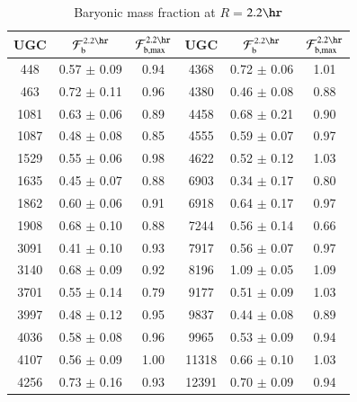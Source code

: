 %
%
%
\begin{table}
\caption{\label{tab:F}
Baryonic mass fraction at $R$$=$$2.2\hr$}
\centering
%
\begin{tabular}{|c c c| c c c|}
\hline
%
\multicolumn{1}{|c}{UGC}                                &
\multicolumn{1}{c}{$\mathcal{F}_{\rm b}^{2.2\hr}$}      &
\multicolumn{1}{c|}{$\mathcal{F}_{\rm b,max}^{2.2\hr}$} &
\multicolumn{1}{c}{UGC}                                 &
\multicolumn{1}{c}{$\mathcal{F}_{\rm b}^{2.2\hr}$}      &
\multicolumn{1}{c|}{$\mathcal{F}_{\rm b,max}^{2.2\hr}$} \\
\hline
  448 &  0.57 $\pm$ 0.09 & 0.94 &  4368 &  0.72 $\pm$ 0.06 & 1.01 \\
  463 &  0.72 $\pm$ 0.11 & 0.96 &  4380 &  0.46 $\pm$ 0.08 & 0.88 \\
 1081 &  0.63 $\pm$ 0.06 & 0.89 &  4458 &  0.68 $\pm$ 0.21 & 0.90 \\
 1087 &  0.48 $\pm$ 0.08 & 0.85 &  4555 &  0.59 $\pm$ 0.07 & 0.97 \\
 1529 &  0.55 $\pm$ 0.06 & 0.98 &  4622 &  0.52 $\pm$ 0.12 & 1.03 \\
 1635 &  0.45 $\pm$ 0.07 & 0.88 &  6903 &  0.34 $\pm$ 0.17 & 0.80 \\
 1862 &  0.60 $\pm$ 0.06 & 0.91 &  6918 &  0.64 $\pm$ 0.17 & 0.97 \\
 1908 &  0.68 $\pm$ 0.10 & 0.88 &  7244 &  0.56 $\pm$ 0.14 & 0.66 \\
 3091 &  0.41 $\pm$ 0.10 & 0.93 &  7917 &  0.56 $\pm$ 0.07 & 0.97 \\
 3140 &  0.68 $\pm$ 0.09 & 0.92 &  8196 &  1.09 $\pm$ 0.05 & 1.09 \\
 3701 &  0.55 $\pm$ 0.14 & 0.79 &  9177 &  0.51 $\pm$ 0.09 & 1.03 \\
 3997 &  0.48 $\pm$ 0.12 & 0.95 &  9837 &  0.44 $\pm$ 0.08 & 0.89 \\
 4036 &  0.58 $\pm$ 0.08 & 0.96 &  9965 &  0.53 $\pm$ 0.09 & 0.94 \\
 4107 &  0.56 $\pm$ 0.09 & 1.00 & 11318 &  0.66 $\pm$ 0.10 & 1.03 \\
 4256 &  0.73 $\pm$ 0.16 & 0.93 & 12391 &  0.70 $\pm$ 0.09 & 0.94 \\
\hline
\end{tabular}
%
\end{table}
